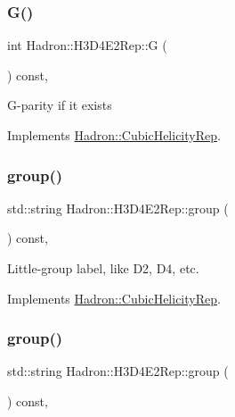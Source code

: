 \subsubsection{\texorpdfstring{G()}{G()}\hspace{0.1cm}{\footnotesize\ttfamily [3/3]}}
{\footnotesize\ttfamily int Hadron\+::\+H3\+D4\+E2\+Rep\+::G (\begin{DoxyParamCaption}{ }\end{DoxyParamCaption}) const\hspace{0.3cm}{\ttfamily [inline]}, {\ttfamily [virtual]}}

G-\/parity if it exists 

Implements \mbox{\hyperlink{structHadron_1_1CubicHelicityRep_a50689f42be1e6170aa8cf6ad0597018b}{Hadron\+::\+Cubic\+Helicity\+Rep}}.

\mbox{\label{structHadron_1_1H3D4E2Rep_acfd57e0a45fce51a748dfe354f357e8a}} 
\subsubsection{\texorpdfstring{group()}{group()}\hspace{0.1cm}{\footnotesize\ttfamily [1/5]}}
{\footnotesize\ttfamily std\+::string Hadron\+::\+H3\+D4\+E2\+Rep\+::group (\begin{DoxyParamCaption}{ }\end{DoxyParamCaption}) const\hspace{0.3cm}{\ttfamily [inline]}, {\ttfamily [virtual]}}

Little-\/group label, like D2, D4, etc. 

Implements \mbox{\hyperlink{structHadron_1_1CubicHelicityRep_a101a7d76cd8ccdad0f272db44b766113}{Hadron\+::\+Cubic\+Helicity\+Rep}}.

\mbox{\label{structHadron_1_1H3D4E2Rep_acfd57e0a45fce51a748dfe354f357e8a}} 
\subsubsection{\texorpdfstring{group()}{group()}\hspace{0.1cm}{\footnotesize\ttfamily [2/5]}}
{\footnotesize\ttfamily std\+::string Hadron\+::\+H3\+D4\+E2\+Rep\+::group (\begin{DoxyParamCaption}{ }\end{DoxyParamCaption}) const\hspace{0.3cm}{\ttfamily [inline]}, {\ttfamily [virtual]}}

